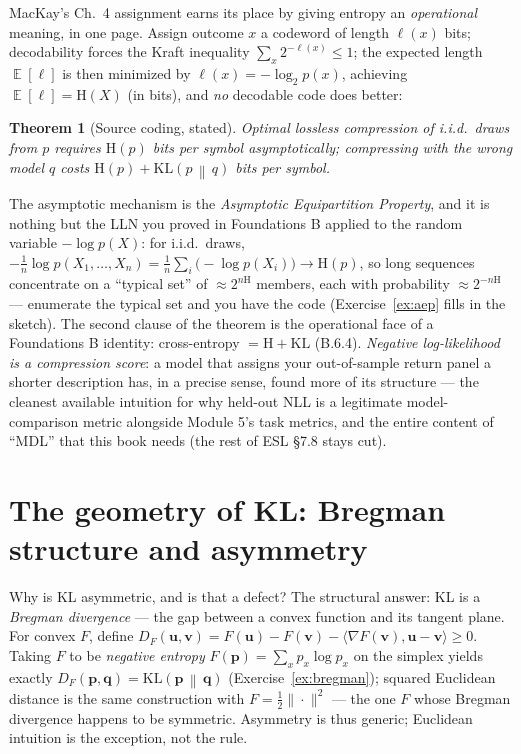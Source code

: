 \documentclass[11pt]{article}
\numberwithin{equation}{section}
\theoremstyle{plain}
\newtheorem{theorem}{Theorem}[section]
\theoremstyle{definition}
\theoremstyle{remark}
\DeclareMathOperator{\E}{\mathbb{E}}
\newcommand{\KL}[2]{\mathrm{KL}\!\left(#1 \,\middle\|\, #2\right)}
\newcommand{\Hent}{\mathrm{H}}
\begin{document}
MacKay's Ch.\ 4 assignment earns its place by giving entropy an \emph{operational} meaning, in one page. Assign outcome $x$ a codeword of length $\ell(x)$ bits; decodability forces the Kraft inequality $\sum_x 2^{-\ell(x)} \le 1$; the expected length $\E[\ell]$ is then minimized by $\ell(x) = -\log_2 p(x)$, achieving $\E[\ell] = \Hent(X)$ (in bits), and \emph{no} decodable code does better:

\begin{theorem}[Source coding, stated]\label{thm:coding}
Optimal lossless compression of i.i.d.\ draws from $p$ requires $\Hent(p)$ bits per symbol asymptotically; compressing with the wrong model $q$ costs $\Hent(p) + \KL{p}{q}$ bits per symbol.
\end{theorem}

The asymptotic mechanism is the \emph{Asymptotic Equipartition Property}, and it is nothing but the LLN you proved in Foundations B applied to the random variable $-\log p(X)$: for i.i.d.\ draws, $-\tfrac1n \log p(X_1, \dots, X_n) = \tfrac1n \sum_i \big(-\log p(X_i)\big) \to \Hent(p)$, so long sequences concentrate on a ``typical set'' of $\approx 2^{n\Hent}$ members, each with probability $\approx 2^{-n\Hent}$ --- enumerate the typical set and you have the code (Exercise~\ref{ex:aep} fills in the sketch). The second clause of the theorem is the operational face of a Foundations B identity: cross-entropy $= \Hent + \mathrm{KL}$ (B.6.4). \emph{Negative log-likelihood is a compression score}: a model that assigns your out-of-sample return panel a shorter description has, in a precise sense, found more of its structure --- the cleanest available intuition for why held-out NLL is a legitimate model-comparison metric alongside Module 5's task metrics, and the entire content of ``MDL'' that this book needs (the rest of ESL \S7.8 stays cut).

\section{The geometry of KL: Bregman structure and asymmetry}\label{sec:klgeom}

Why is KL asymmetric, and is that a defect? The structural answer: KL is a \emph{Bregman divergence} --- the gap between a convex function and its tangent plane. For convex $F$, define $D_F(\bm u, \bm v) = F(\bm u) - F(\bm v) - \langle \nabla F(\bm v), \bm u - \bm v \rangle \ge 0$. Taking $F$ to be \emph{negative entropy} $F(\bm p) = \sum_x p_x \log p_x$ on the simplex yields exactly $D_F(\bm p, \bm q) = \KL{\bm p}{\bm q}$ (Exercise~\ref{ex:bregman}); squared Euclidean distance is the same construction with $F = \tfrac12\|\cdot\|^2$ --- the one $F$ whose Bregman divergence happens to be symmetric. Asymmetry is thus generic; Euclidean intuition is the exception, not the rule.
\end{document}
